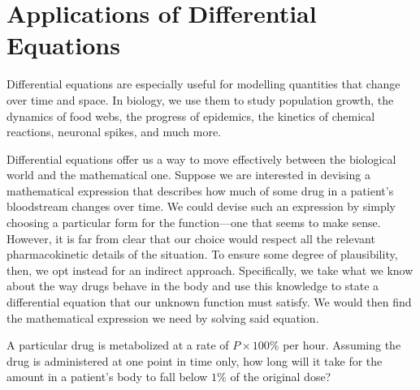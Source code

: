 \documentclass[../book.tex]{subfiles}
\begin{document}
\section{Applications of Differential Equations}

Differential equations are especially useful for modelling quantities that change over time and space. In biology, we use them to study population growth, the dynamics of food webs, the progress of epidemics, the kinetics of chemical reactions, neuronal spikes, and much more.

Differential equations offer us a way to move effectively between the biological world and the mathematical one. Suppose we are interested in devising a mathematical expression that describes how much of some drug in a patient's bloodstream changes over time. We could devise such an expression by simply choosing a particular form for the function---one that seems to make sense. However, it is far from clear that our choice would respect all the relevant pharmacokinetic details of the situation. To ensure some degree of plausibility, then, we opt instead for an indirect approach. Specifically, we take what we know about the way drugs behave in the body and use this knowledge to state a differential equation that our unknown function must satisfy. We would then find the mathematical expression we need by solving said equation.

\begin{example} \label{eg:drug1}
A particular drug is metabolized at a rate of \(P\times 100\%\) per hour. Assuming the drug is administered at one point in time only, how long will it take for the amount in a patient's body to fall below \(1\%\) of the original dose?
\end{example}
\end{document}

